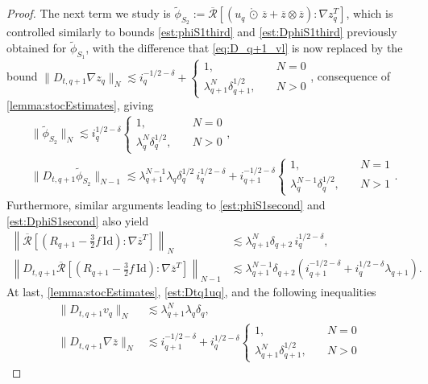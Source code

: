 \documentclass[10pt,a4paper]{amsart}
\numberwithin{equation}{section}
\numberwithin{corollario}{section}
\numberwithin{lemma}{section}
\numberwithin{prop}{section}
\theoremstyle{definition}
\theoremstyle{remark}
\newcommand{\Id}{\mathrm{Id}}
\newcommand{\varz}{\overline{z}}
\newcommand{\qq}{_{q+1}}
\newcommand{\SymOtNoTr}{\,\mathring{\odot}\,}
\begin{document}
\begin{proof}
The next term we study is $\tilde{\phi}_{S_2}:= \overline{\mathcal{R}}[(u_q\SymOtNoTr\varz+\varz \otimes \varz ):\nabla z_q^T ]$, which is controlled similarly to bounds \eqref{est:phiS1third} and \eqref{est:DphiS1third} previously obtained for $\tilde{\phi}_{S_1}$, with the difference that \eqref{eq:D_q+1_vl} is now replaced by the bound $\|D_{t,q+1}\nabla z_q\|_N\lesssim i_q^{-1/2-\delta}+\begin{cases}
        1,\quad &N=0\\
        \lambda\qq^N\delta\qq^{1/2},\quad &N>0
    \end{cases}$, consequence of \autoref{lemma:stocEstimates}, 
giving
\begin{align}\label{est:phiS2third}
    &\|\tilde{\phi}_{S_2}\|_N\lesssim i_q^{1/2-\delta}\begin{cases}
        1,\quad &N=0\\
        \lambda_q^N\delta_q^{1/2},\quad &N>0
    \end{cases},\\
    &\|D_{t,q+1}\tilde{\phi}_{S_2}\|_{N-1}\lesssim \lambda\qq^{N-1}\lambda_q\delta_q^{1/2}\,i_q^{1/2-\delta}+i\qq^{-1/2-\delta}\begin{cases}
        1,\quad &N=1\\
        \lambda_q^{N-1}\delta_q^{1/2},\quad &N>1
    \end{cases}.
\end{align}
Furthermore, similar arguments leading to \eqref{est:phiS1second} and \eqref{est:DphiS1second} also yield
\begin{align}\label{est:phiS2second}
    \left\|\overline{\mathcal{R}}\left[\left(R\qq-\frac32f\,\Id\right):\nabla \varz^T\right]\right\|_N
    &\lesssim 
    \lambda\qq^N \delta_{q+2}\,i_q^{1/2-\delta},\\
        \left\|D_{t,q+1}\overline{\mathcal{R}}\left[\left(R\qq-\frac32f\,\Id\right):\nabla \varz^T\right]\right\|_{N-1}
        &\lesssim 
        \lambda\qq^{N-1}\delta_{q+2}(i\qq^{-1/2-\delta}+i_q^{1/2-\delta}\lambda\qq).
\end{align}
At last, \autoref{lemma:stocEstimates}, \eqref{est:Dtq1uq}, and the following inequalities
\begin{align}
    \|D_{t,q+1}v_q\|_N
    &\lesssim \lambda\qq^N\lambda_q\delta_q,
    \\
    \|D_{t,q+1}\nabla \varz\|_N
    &\lesssim i\qq^{-1/2-\delta}+i_q^{1/2-\delta}\begin{cases}
        1,\quad &N=0\\
        \lambda\qq^N\delta\qq^{1/2},\quad &N>0

\end{cases}
\end{align}
\end{proof}
\end{document}
